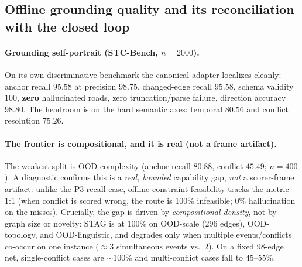 \subsection{Offline grounding quality and its reconciliation with the closed loop}
\label{sec:p4}

\paragraph{Grounding self-portrait (STC-Bench, $n{=}2000$).}
On its own discriminative benchmark the canonical adapter localizes cleanly: anchor recall $95.58$ at
precision $98.75$, changed-edge recall $95.58$, schema validity $100$, \textbf{zero} hallucinated roads,
zero truncation/parse failure, direction accuracy $98.80$. The headroom is on the hard semantic axes:
temporal $80.56$ and conflict resolution $75.26$.

\paragraph{The frontier is compositional, and it is real (not a frame artifact).}
\label{sec:p4reconcile}
The weakest split is OOD-complexity (anchor recall $80.88$, conflict $45.49$; $n{=}400$). A diagnostic
confirms this is a \emph{real, bounded} capability gap, \emph{not} a scorer-frame artifact: unlike the P3
recall case, offline constraint-feasibility tracks the metric 1:1 (when conflict is scored wrong, the
route is 100\% infeasible; 0\% hallucination on the misses). Crucially, the gap is driven by
\emph{compositional density}, not by graph size or novelty: STAG is at 100\% on OOD-scale (296 edges),
OOD-topology, and OOD-linguistic, and degrades only when multiple events/conflicts co-occur on one
instance ($\approx$3 simultaneous events vs.\ 2). On a fixed 98-edge net, single-conflict cases are
$\sim$100\% and multi-conflict cases fall to 45--55\%.

